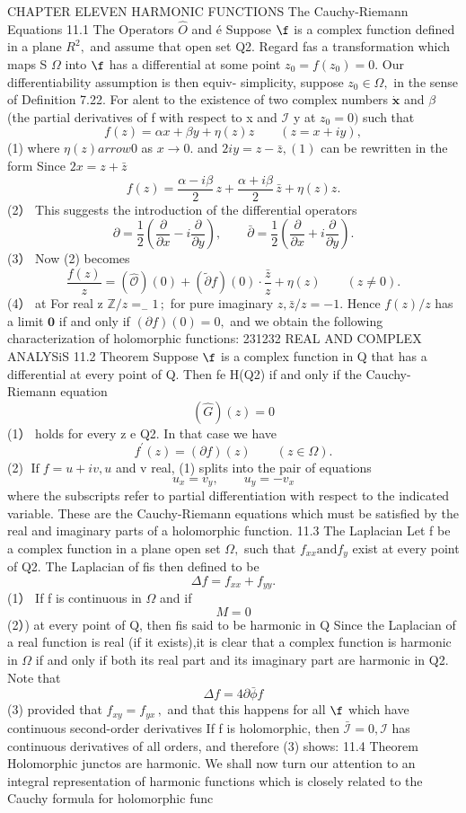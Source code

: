 CHAPTER ELEVEN HARMONIC FUNCTIONS The Cauchy-Riemann Equations 11.1 The Operators $\scriptstyle{\hat{O}}$ and é Suppose $\boldsymbol{\f}$ is a complex function defined in a plane $R^{2},$ and assume that open set Q2. Regard fas a transformation which maps S $\Omega$ into $\boldsymbol{\f}$ has a differential at some point $z_{0}=f(z_{0})=0.$ Our differentiability assumption is then equiv- simplicity, suppose $z_{0}\in\Omega,$ in the sense of Definition 7.22. For alent to the existence of two complex numbers $\scriptstyle{\dot{\mathbf{x}}}$ and $\beta$ (the partial derivatives of f with respect to x and $\scriptstyle{\mathcal{I}}$ y at $z_{0}=0)$ such that $$ f(z)=\alpha x+\beta y+\eta(z)z\qquad(z=x+i y), $$ (1) where $\eta(z) arrow0$ as $\scriptstyle x\to0.$ and $2i y=z-\bar{z},(1)$ can be rewritten in the form Since $2x=z+{\bar{z}}$ $$ f(z)=\frac{\alpha-i\beta}{2}\,z+\frac{\alpha+i\beta}{2}\,\bar{z}+\eta(z)z. $$ (2） This suggests the introduction of the differential operators $$ \partial=\frac{1}{2}\left(\frac{\partial}{\partial x}-i\frac{\partial}{\partial y}\right),\qquad\bar{\partial}=\frac{1}{2}\left(\frac{\partial}{\partial x}+i\frac{\partial}{\partial y}\right). $$ (3） Now (2) becomes $$ {\frac{f(z)}{z}}=(\hat{\mathcal{O}})(0)+(\tilde{\partial}f)(0)\cdot{\frac{\bar{z}}{z}}+\eta(z)\qquad(z\neq0). $$ (4） at For real z $\mathbb{Z}/z=_{-}1\,;$ for pure imaginary $z,{\bar{z}}/z=-1.$ Hence $f(z)/z$ has a limit $\mathbf{0}$ if and only if $(\partial f)(0)=0,$ and we obtain the following characterization of holomorphic functions: 231232 REAL AND COMPLEX ANALYSiS 11.2 Theorem Suppose $\boldsymbol{\f}$ is a complex function in Q that has a differential at every point of Q. Then fe H(Q2) if and only if the Cauchy-Riemann equation $$ ({\hat{G}})(z)=0 $$ (1） holds for every z e Q2. In that case we have $$ f^{\prime}(z)=(\partial f)(z)\qquad(z\in\Omega). $$ (2) $\operatorname{If}f=u+i v,u$ and v real, (1) splits into the pair of equations $$ u_{x}=v_{y},\qquad u_{y}=-v_{x} $$ where the subscripts refer to partial differentiation with respect to the indicated variable. These are the Cauchy-Riemann equations which must be satisfied by the real and imaginary parts of a holomorphic function. 11.3 The Laplacian Let f be a complex function in a plane open set $\Omega,$ such that $f_{x x}{\mathrm{and}}f_{y}$ exist at every point of Q2. The Laplacian of fis then defined to be $$ \Delta f=f_{x x}+f_{y y}. $$ (1） If f is continuous in $\Omega$ and if $$ \scriptstyle M=0 $$ (2）) at every point of Q, then fis said to be harmonic in Q Since the Laplacian of a real function is real (if it exists),it is clear that a complex function is harmonic in $\Omega$ if and only if both its real part and its imaginary part are harmonic in Q2. Note that $$ \Delta f=4\partial\bar{\phi}f $$ (3) provided that $f_{x y}=f_{y x}\,,$ and that this happens for all $\boldsymbol{\f}$ which have continuous second-order derivatives If f is holomorphic, then ${\bar{\mathcal{I}}}=0,{\mathcal{I}}$ has continuous derivatives of all orders, and therefore (3) shows: 11.4 Theorem Holomorphic junctos are harmonic. We shall now turn our attention to an integral representation of harmonic functions which is closely related to the Cauchy formula for holomorphic func 